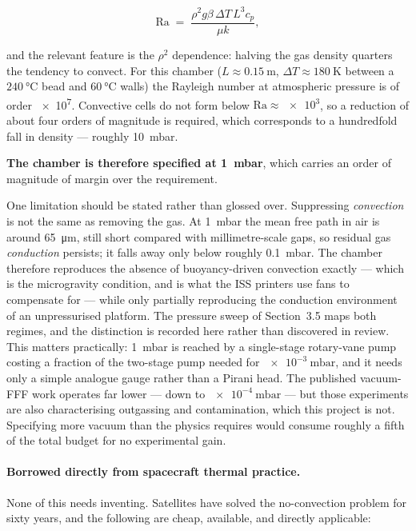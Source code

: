 \documentclass[11pt,a4paper]{article}
\begin{document}
\begin{equation}
  \mathrm{Ra} \;=\; \frac{\rho^{2}g\beta\,\Delta T\,L^{3}c_p}{\mu k},
\end{equation}

and the relevant feature is the \(\rho^{2}\) dependence: halving the gas density
quarters the tendency to convect. For this chamber
(\(L \approx \SI{0.15}{\metre}\), \(\Delta T \approx \SI{180}{\kelvin}\) between
a \(\SI{240}{\celsius}\) bead and \(\SI{60}{\celsius}\) walls) the Rayleigh
number at atmospheric pressure is of order \num{e7}. Convective cells do not form
below \(\mathrm{Ra} \approx \num{e3}\), so a reduction of about four orders of
magnitude is required, which corresponds to a hundredfold fall in density ---
roughly \SI{10}{\milli\bar}.

\textbf{The chamber is therefore specified at \SI{1}{\milli\bar}}, which carries
an order of magnitude of margin over the requirement.

One limitation should be stated rather than glossed over. Suppressing
\emph{convection} is not the same as removing the gas. At \SI{1}{\milli\bar} the
mean free path in air is around \SI{65}{\micro\metre}, still short compared with
millimetre-scale gaps, so residual gas \emph{conduction} persists; it falls away
only below roughly \SI{0.1}{\milli\bar}. The chamber therefore reproduces the
absence of buoyancy-driven convection exactly --- which is the microgravity
condition, and is what the ISS printers use fans to compensate for --- while only
partially reproducing the conduction environment of an unpressurised platform.
The pressure sweep of Section~3.5 maps both regimes, and the distinction is
recorded here rather than discovered in review. This matters practically:
\SI{1}{\milli\bar} is reached by a single-stage rotary-vane pump costing a
fraction of the two-stage pump needed for \(\SI{e-3}{\milli\bar}\), and it needs
only a simple analogue gauge rather than a Pirani head. The published vacuum-FFF
work operates far lower --- down to \(\SI{e-4}{\milli\bar}\)
\cite{scirep2025vacuumfff} --- but those experiments are also characterising
outgassing and contamination, which this project is not. Specifying more vacuum
than the physics requires would consume roughly a fifth of the total budget for
no experimental gain.

\paragraph{Borrowed directly from spacecraft thermal practice.} None of this
needs inventing. Satellites have solved the no-convection problem for sixty
years, and the following are cheap, available, and directly applicable:
\end{document}
